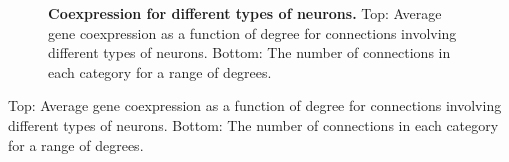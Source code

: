 \documentclass[10pt,letterpaper]{article}
\newlength\savedwidth
\newcommand\thickhline{\noalign{\global\savedwidth\arrayrulewidth\global\arrayrulewidth 2pt}%
\hline
\noalign{\global\arrayrulewidth\savedwidth}}
\begin{document}
\begin{figure}[!h]
 \caption{{\bf Coexpression for different types of neurons. }
Top: Average gene coexpression as a function of degree for connections involving different types of neurons. Bottom: The number of connections in each category for a range of degrees. }
 \label{NeuronTypePlot}
 \end{figure}
Top: Average gene coexpression as a function of degree for connections involving different types of neurons. Bottom: The number of connections in each category for a range of degrees. 




\end{document}
